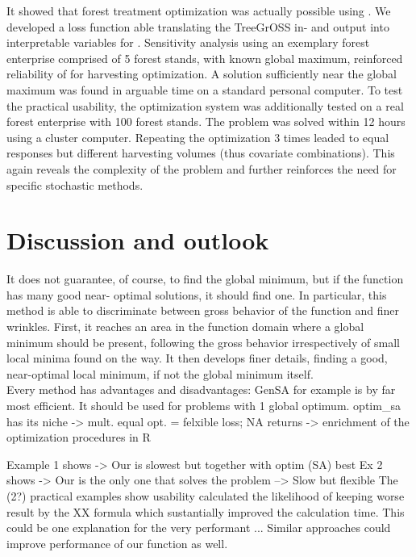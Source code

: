 It showed that forest treatment optimization was actually possible using . We developed a loss function able translating the TreeGrOSS in- and output into interpretable variables for . Sensitivity analysis using an exemplary forest enterprise comprised of 5 forest stands, with known global maximum, reinforced reliability of  for harvesting optimization. A solution sufficiently near the global maximum was found in arguable time on a standard personal computer. To test the practical usability, the optimization system was additionally tested on a real forest enterprise with 100 forest stands. The problem was solved within 12 hours using a cluster computer. Repeating the optimization 3 times leaded to equal responses but different harvesting volumes (thus covariate combinations). This again reveals the complexity of the problem and further reinforces the need for specific stochastic methods.

\section{Discussion and outlook}
It does not guarantee, of course, to find the global minimum, but if the function has many good near- optimal solutions, it should find one. In particular, this method is able to discriminate between gross behavior of the function and finer wrinkles. First, it reaches an area in the function domain where a global minimum should be present, following the gross behavior irrespectively of small local minima found on the way. It then develops finer details, finding a good, near-optimal local minimum, if not the global minimum itself.\\

Every method has advantages and disadvantages: GenSA for example is by far most efficient. It should be used for problems with 1 global optimum. optim\_sa has its niche -> mult. equal opt. = felxible loss; NA returns
-> enrichment of the optimization procedures in R  

Example 1 shows -> Our is slowest but together with optim (SA) best
Ex 2 shows -> Our is the only one that solves the problem
	--> Slow but flexible
The (2?) practical examples show usability
\citet{xiang_2013} calculated the likelihood of keeping worse result by the XX formula which sustantially improved the calculation time. This could be one explanation for the very performant ... Similar approaches could improve performance of our function as well.



\address{Author One\\
  Affiliation\\
  Address\\
  Country\\}

\address{Author Two\\
  Affiliation\\
  Address\\
  Country\\}

\address{Author Three\\
  Affiliation\\
  Address\\
  Country\\}
